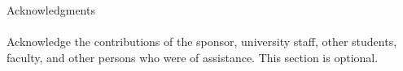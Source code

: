 Acknowledgments
\\
\\
Acknowledge the contributions of the sponsor, university staff, other students, faculty, and other persons who were of assistance. This section is optional.
